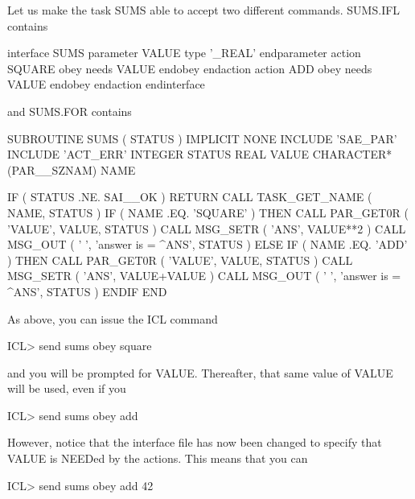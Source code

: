 \documentclass[twoside,11pt,nolof]{starlink}
\begin{document}
Let us make the task SUMS able to accept two different commands.
SUMS.IFL contains

\begin{small}
\begin{terminalv}
interface SUMS
   parameter VALUE
      type '_REAL'
   endparameter
   action SQUARE
      obey needs VALUE
      endobey
   endaction
   action ADD
      obey needs VALUE
      endobey
   endaction
endinterface
\end{terminalv}
\end{small}

and SUMS.FOR contains

\begin{small}
\begin{terminalv}
      SUBROUTINE SUMS ( STATUS )
      IMPLICIT NONE
      INCLUDE 'SAE_PAR'
      INCLUDE 'ACT_ERR'
      INTEGER STATUS
      REAL VALUE
      CHARACTER*(PAR__SZNAM) NAME

      IF ( STATUS .NE. SAI__OK ) RETURN
      CALL TASK_GET_NAME ( NAME, STATUS )
      IF ( NAME .EQ. 'SQUARE' ) THEN
         CALL PAR_GET0R ( 'VALUE', VALUE, STATUS )
         CALL MSG_SETR ( 'ANS', VALUE**2 )
         CALL MSG_OUT ( ' ', 'answer is = ^ANS', STATUS )
      ELSE IF ( NAME .EQ. 'ADD' ) THEN
         CALL PAR_GET0R ( 'VALUE', VALUE, STATUS )
         CALL MSG_SETR ( 'ANS', VALUE+VALUE )
         CALL MSG_OUT ( ' ', 'answer is = ^ANS', STATUS )
      ENDIF
      END
\end{terminalv}
\end{small}

As above, you can issue the ICL command

\begin{small}
\begin{terminalv}
ICL> send sums obey square
\end{terminalv}
\end{small}

and you will be prompted for VALUE. Thereafter, that same value of VALUE
will be used, even if you

\begin{small}
\begin{terminalv}
ICL> send sums obey add
\end{terminalv}
\end{small}

However, notice that the interface file has now been changed to specify that
VALUE is NEEDed by the actions. This means that you can

\begin{small}
\begin{terminalv}
ICL> send sums obey add 42
\end{terminalv}
\end{small}
\end{document}
